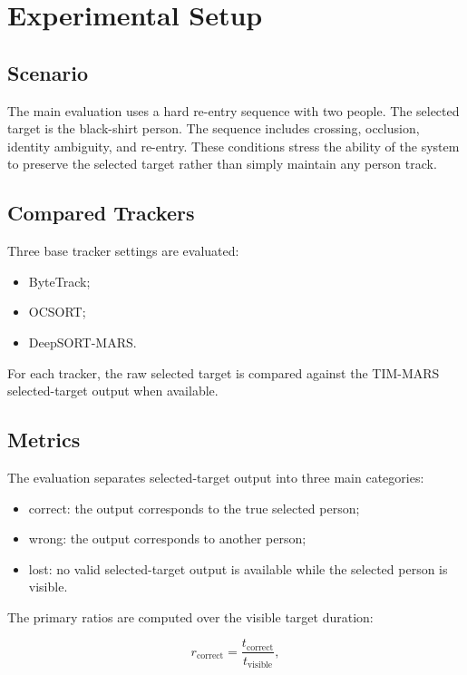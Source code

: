 \section{Experimental Setup}

\subsection{Scenario}

The main evaluation uses a hard re-entry sequence with two people. The selected target is the black-shirt person. The sequence includes crossing, occlusion, identity ambiguity, and re-entry. These conditions stress the ability of the system to preserve the selected target rather than simply maintain any person track.

\subsection{Compared Trackers}

Three base tracker settings are evaluated:

\begin{itemize}
    \item ByteTrack;
    \item OCSORT;
    \item DeepSORT-MARS.
\end{itemize}

For each tracker, the raw selected target is compared against the TIM-MARS selected-target output when available.

\subsection{Metrics}

The evaluation separates selected-target output into three main categories:

\begin{itemize}
    \item correct: the output corresponds to the true selected person;
    \item wrong: the output corresponds to another person;
    \item lost: no valid selected-target output is available while the selected person is visible.
\end{itemize}

The primary ratios are computed over the visible target duration:

\begin{equation}
r_\mathrm{correct} = \frac{t_\mathrm{correct}}{t_\mathrm{visible}},
\end{equation}

